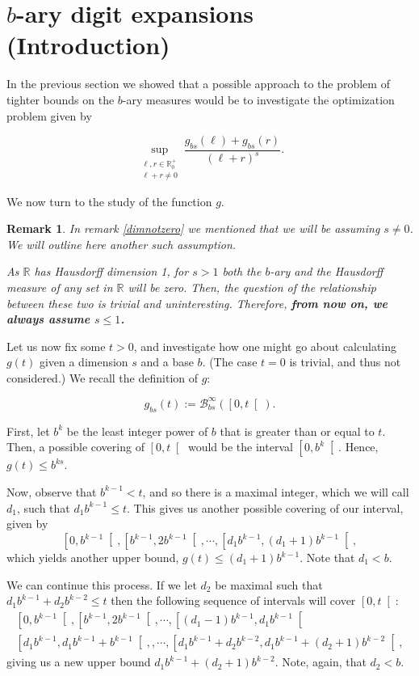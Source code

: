 \documentclass[11pt, reqno]{amsart}
\newcommand{\R}{\mathbb{R}}
\newcommand{\BB}{\mathcal{B}}
\newtheorem{remark}{Remark}
\begin{document}
\section{$b$-ary digit expansions (Introduction)}\label{sec6}

In the previous section we showed that a possible approach to the problem of tighter bounds on the $b$-ary measures would be to investigate the optimization problem given by

\[ \sup_{\substack{\ell,r \in \R^+_0\\\ell+r \neq 0}} \frac{g_{bs}(\ell) + g_{bs}(r)}{(\ell + r)^s}. \]

We now turn to the study of the function $g$.

\begin{remark}
In remark \ref{dimnotzero} we mentioned that we will be assuming $s \neq 0$. We will outline here another such assumption.

As $\R$ has Hausdorff dimension 1, for $s > 1$ both the $b$-ary and the Hausdorff measure of \emph{any} set in $\R$ will be zero. Then, the question of the relationship between these two is trivial and uninteresting. Therefore, \textbf{from now on, we always assume $s \leq 1$.}
\end{remark}

Let us now fix some $t > 0$, and investigate how one might go about calculating $g(t)$ given a dimension $s$ and a base $b$. (The case $t = 0$ is trivial, and thus not considered.) We recall the definition of $g$:

\[g_{bs}(t) := \BB_{bs}^\infty(\left[0, t \right[).\]

First, let $b^k$ be the least integer power of $b$ that is greater than or equal to $t$. Then, a possible covering of $\left[0, t \right[$ would be the interval $\left[0, b^k\right[$. Hence, $g(t) \leq b^{ks}$.

Now, observe that $b^{k-1} < t$, and so there is a maximal integer, which we will call $d_1$, such that $d_1 b^{k-1} \leq t$. This gives us another possible covering of our interval, given by
\[\left[0, b^{k-1} \right[, \left[b^{k-1}, 2 b^{k-1} \right[, \cdots, \left[d_1 b^{k-1}, (d_1 + 1) b^{k-1} \right[,\]
which yields another upper bound, $g(t) \leq (d_1 + 1) b^{k-1}$. Note that $d_1 < b$.

We can continue this process. If we let $d_2$ be maximal such that $d_1 b^{k-1} + d_2 b^{k-2} \leq t$ then the following sequence of intervals will cover $\left[0, t \right[$:
\begin{multline*}
\left[0, b^{k-1} \right[, \left[b^{k-1}, 2 b^{k-1} \right[, \cdots, \left[(d_1 - 1) b^{k-1}, d_1 b^{k-1} \right[ \\
\left[d_1 b^{k-1}, d_1 b^{k-1} + b^{k-1} \right[, , \cdots, \left[d_1 b^{k-1} + d_2 b^{k-2}, d_1 b^{k-1} + (d_2 + 1) b^{k-2} \right[,
\end{multline*}
giving us a new upper bound $d_1 b^{k-1} + (d_2 + 1) b^{k-2}$. Note, again, that $d_2 < b$.
\end{document}
